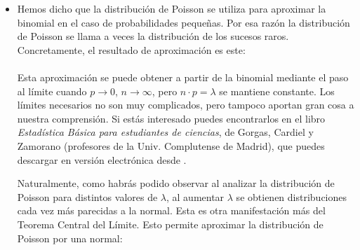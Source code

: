 \begin{itemize}
  \item Hemos dicho que la distribución de Poisson se utiliza para aproximar la binomial en el caso de probabilidades pequeñas. Por esa razón la distribución de Poisson se llama a veces la {\sf distribución de los sucesos raros}. Concretamente, el resultado de aproximación es este:\\[3mm]
         \\[3mm]
         Esta aproximación se puede obtener a partir de la binomial mediante el paso al límite cuando $p\to 0$, $n\to\infty$, pero $n\cdot p=\lambda$ se mantiene constante. Los límites necesarios no son muy complicados, pero tampoco aportan gran cosa a nuestra comprensión. Si estás interesado puedes encontrarlos en el libro {\em Estadística Básica para estudiantes de ciencias}, de Gorgas, Cardiel y Zamorano (profesores de la Univ. Complutense de Madrid), que puedes descargar en versión electrónica desde .

         Naturalmente, como habrás podido observar al analizar la distribución de Poisson para distintos valores de $\lambda$, al aumentar $\lambda$ se obtienen distribuciones cada vez más parecidas a la normal. Esta es otra manifestación más del Teorema Central del Límite. Esto permite aproximar la distribución de Poisson por una normal:\\[3mm]
         \\[3mm]


\end{itemize}
